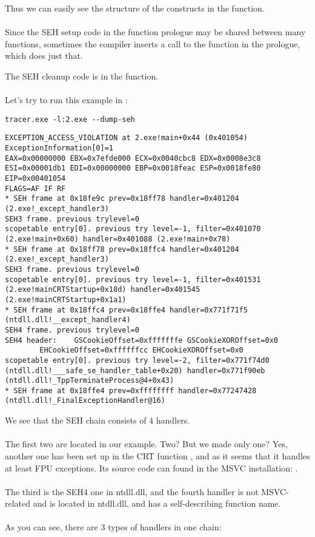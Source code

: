Thus we can easily see the structure of the  constructs in the function.\\
\\
Since the SEH setup code in the function prologue may be shared between many functions,
sometimes the compiler inserts a call to the  function in the prologue, which does just that.

The SEH cleanup code is in the  function.\\
\\
Let's try to run this example in \tracer{}:

\begin{lstlisting}
tracer.exe -l:2.exe --dump-seh
\end{lstlisting}

\begin{lstlisting}[caption=tracer.exe output]
EXCEPTION_ACCESS_VIOLATION at 2.exe!main+0x44 (0x401054) ExceptionInformation[0]=1
EAX=0x00000000 EBX=0x7efde000 ECX=0x0040cbc8 EDX=0x0008e3c8
ESI=0x00001db1 EDI=0x00000000 EBP=0x0018feac ESP=0x0018fe80
EIP=0x00401054
FLAGS=AF IF RF
* SEH frame at 0x18fe9c prev=0x18ff78 handler=0x401204 (2.exe!_except_handler3)
SEH3 frame. previous trylevel=0
scopetable entry[0]. previous try level=-1, filter=0x401070 (2.exe!main+0x60) handler=0x401088 (2.exe!main+0x78)
* SEH frame at 0x18ff78 prev=0x18ffc4 handler=0x401204 (2.exe!_except_handler3)
SEH3 frame. previous trylevel=0
scopetable entry[0]. previous try level=-1, filter=0x401531 (2.exe!mainCRTStartup+0x18d) handler=0x401545 (2.exe!mainCRTStartup+0x1a1)
* SEH frame at 0x18ffc4 prev=0x18ffe4 handler=0x771f71f5 (ntdll.dll!__except_handler4)
SEH4 frame. previous trylevel=0
SEH4 header:	GSCookieOffset=0xfffffffe GSCookieXOROffset=0x0
		EHCookieOffset=0xffffffcc EHCookieXOROffset=0x0
scopetable entry[0]. previous try level=-2, filter=0x771f74d0 (ntdll.dll!___safe_se_handler_table+0x20) handler=0x771f90eb (ntdll.dll!_TppTerminateProcess@4+0x43)
* SEH frame at 0x18ffe4 prev=0xffffffff handler=0x77247428 (ntdll.dll!_FinalExceptionHandler@16)
\end{lstlisting}

We see that the SEH chain consists of 4 handlers.\\
\\
The first two are located in our example. Two?
But we made only one?
Yes, another one has been set up in the \ac{CRT} function , and as it seems that it handles at least \ac{FPU} exceptions.
Its source code can found in the MSVC installation: .\\
\\
The third is the SEH4 one in ntdll.dll, 
and the fourth handler is not MSVC-related and is located in ntdll.dll, and has a self-describing function name.\\
\\
As you can see, there are 3 types of handlers in one chain:


